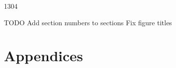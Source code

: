\documentclass[11pt, a4paper]{article}
\begin{document}
1304

TODO
  Add section numbers to sections
  Fix figure titles

% 

% 

% 

% 



% 



% 

% 

% 


% 

\newpage




\newpage
\section{Appendices}
\end{document}
